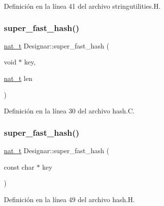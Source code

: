 Definición en la línea 41 del archivo stringutilities.\+H.

\mbox{\label{namespace_designar_afd5712d16b3ae1c1c7d59f1004cd96fd}} 
\subsubsection{\texorpdfstring{super\+\_\+fast\+\_\+hash()}{super\_fast\_hash()}\hspace{0.1cm}{\footnotesize\ttfamily [1/5]}}
{\footnotesize\ttfamily \hyperlink{namespace_designar_aa72662848b9f4815e7bf31a7cf3e33d1}{nat\+\_\+t} Designar\+::super\+\_\+fast\+\_\+hash (\begin{DoxyParamCaption}\item[{void $\ast$}]{key,  }\item[{\hyperlink{namespace_designar_aa72662848b9f4815e7bf31a7cf3e33d1}{nat\+\_\+t}}]{len }\end{DoxyParamCaption})}



Definición en la línea 30 del archivo hash.\+C.

\mbox{\label{namespace_designar_a090aac15e358ba6f7db1b58d1fed363f}} 
\subsubsection{\texorpdfstring{super\+\_\+fast\+\_\+hash()}{super\_fast\_hash()}\hspace{0.1cm}{\footnotesize\ttfamily [2/5]}}
{\footnotesize\ttfamily \hyperlink{namespace_designar_aa72662848b9f4815e7bf31a7cf3e33d1}{nat\+\_\+t} Designar\+::super\+\_\+fast\+\_\+hash (\begin{DoxyParamCaption}\item[{const char $\ast$}]{key }\end{DoxyParamCaption})\hspace{0.3cm}{\ttfamily [inline]}}



Definición en la línea 49 del archivo hash.\+H.

\mbox{\label{namespace_designar_a289dc254d6e2caad30367f337eb6a04e}} 
